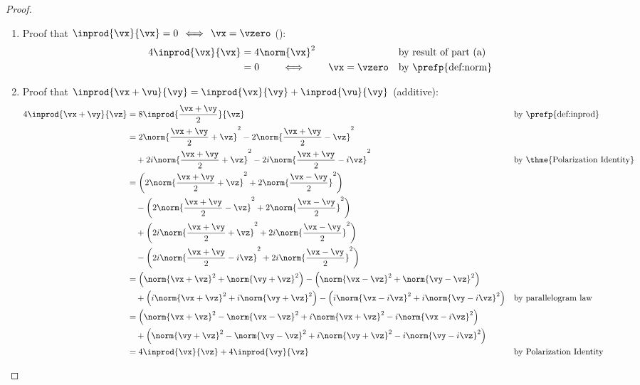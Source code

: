 \begin{proof}
\begin{enumerate}
\begin{enumerate}
    \item Proof that $\inprod{\vx}{\vx} = 0 \,\iff\, \vx=\vzero$ ():
      \begin{align*}
        4\inprod{\vx}{\vx}
          &=    4\norm{\vx}^2
          &&    \text{by result of part (a)}
        \\&=    0 \qquad\iff\qquad \vx=\vzero
          &&    \text{by \prefp{def:norm}}
      \end{align*}

    \item Proof that $\inprod{\vx+\vu}{\vy}=\inprod{\vx}{\vy}+\inprod{\vu}{\vy}$ (additive):
      \begin{align*}
        4\inprod{\vx+\vy}{\vz}
          &= 8\inprod{\frac{\vx+\vy}{2}}{\vz}
          && \text{by \prefp{def:inprod}}
        \\&= 2\norm{\frac{\vx+\vy}{2}+\vz}^2 -  2\norm{\frac{\vx+\vy}{2}-\vz}^2
          \\&\quad+ 2i\norm{\frac{\vx+\vy}{2}+\vz}^2 - 2i\norm{\frac{\vx+\vy}{2}-i\vz}^2
          && \text{by \thme{Polarization Identity}}
        \\&= \left(2\norm{\frac{\vx+\vy}{2}+\vz}^2 + 2\norm{\frac{\vx-\vy}{2}}^2 \right)
          \\&\quad -\left(2\norm{\frac{\vx+\vy}{2}-\vz}^2 + 2\norm{\frac{\vx-\vy}{2}}^2 \right)
          \\&\quad +\left(2i\norm{\frac{\vx+\vy}{2}+\vz}^2 + 2i\norm{\frac{\vx-\vy}{2}}^2 \right)
          \\&\quad -\left(2i\norm{\frac{\vx+\vy}{2}-i\vz}^2 + 2i\norm{\frac{\vx-\vy}{2}}^2 \right)
        \\&= \left(\norm{\vx+\vz}^2 + \norm{\vy+\vz}^2 \right)
            -\left(\norm{\vx-\vz}^2 + \norm{\vy-\vz}^2 \right)
          \\&\quad +\left(i\norm{\vx+\vz}^2 + i\norm{\vy+\vz}^2 \right)
            -\left(i\norm{\vx-i\vz}^2 + i\norm{\vy-i\vz}^2 \right)
          && \text{by parallelogram law}
        \\&= \left(\norm{\vx+\vz}^2 -\norm{\vx-\vz}^2 + i\norm{\vx+\vz}^2 -i\norm{\vx-i\vz}^2 \right)
          \\&\quad +\left(\norm{\vy+\vz}^2 -\norm{\vy-\vz}^2 + i\norm{\vy+\vz}^2 -i\norm{\vy-i\vz}^2 \right)
        \\&= 4\inprod{\vx}{\vz} + 4\inprod{\vy}{\vz}
          && \text{by Polarization Identity}
      \end{align*}


\end{enumerate}
\end{enumerate}
\end{proof}
